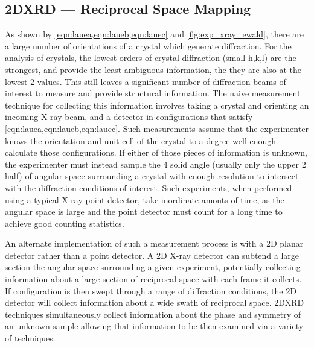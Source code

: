 \subsection{2DXRD --- Reciprocal Space Mapping}
\label{sec:2DXRD}
As shown by \cref{eqn:lauea,eqn:laueb,eqn:lauec} and \cref{fig:exp_xray_ewald}, there are a large number of orientations of a crystal which generate diffraction.
For the analysis of crystals, the lowest orders of crystal diffraction (small h,k,l) are the strongest, and provide the least ambiguous information, the they are also at the lowest 2\straighttheta{} values.
This still leaves a significant number of diffraction beams of interest to measure and provide structural information.
The naive measurement technique for collecting this information involves taking a crystal and orienting an incoming X-ray beam, and a detector in configurations that satisfy \cref{eqn:lauea,eqn:laueb,eqn:lauec}.
Such measurements assume that the experimenter knows the orientation and unit cell of the crystal to a degree well enough calculate those configurations.
If either of those pieces of information is unknown, the experimenter must instead sample the 4\textpi{} solid angle (usually only the upper 2\textpi{} half) of angular space surrounding a crystal with enough resolution to intersect with the diffraction conditions of interest.
Such experiments, when performed using a typical X-ray point detector, take inordinate amonts of time, as the angular space is large and the point detector must count for a long time to achieve good counting statistics.

An alternate implementation of such a measurement process is with a 2D planar detector rather than a point detector.
A 2D X-ray detector can subtend a large section the angular space surrounding a given experiment, potentially collecting information about a large section of reciprocal space with each frame it collects.
If configuration is then swept through a range of diffraction conditions, the 2D detector will collect information about a wide swath of reciprocal space.
2DXRD techniques simultaneously collect information about the phase and symmetry of an unknown sample allowing that information to be then examined via a variety of techniques.

